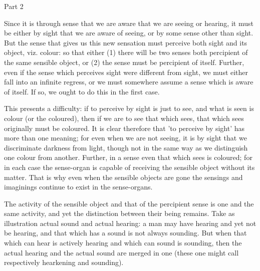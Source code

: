 Part 2

Since it is through sense that we are aware that we are seeing or
hearing, it must be either by sight that we are aware of seeing, or
by some sense other than sight. But the sense that gives us this new
sensation must perceive both sight and its object, viz. colour: so
that either (1) there will be two senses both percipient of the same
sensible object, or (2) the sense must be percipient of itself. Further,
even if the sense which perceives sight were different from sight,
we must either fall into an infinite regress, or we must somewhere
assume a sense which is aware of itself. If so, we ought to do this
in the first case. 

This presents a difficulty: if to perceive by sight is just to see,
and what is seen is colour (or the coloured), then if we are to see
that which sees, that which sees originally must be coloured. It is
clear therefore that 'to perceive by sight' has more than one meaning;
for even when we are not seeing, it is by sight that we discriminate
darkness from light, though not in the same way as we distinguish
one colour from another. Further, in a sense even that which sees
is coloured; for in each case the sense-organ is capable of receiving
the sensible object without its matter. That is why even when the
sensible objects are gone the sensings and imaginings continue to
exist in the sense-organs. 

The activity of the sensible object and that of the percipient sense
is one and the same activity, and yet the distinction between their
being remains. Take as illustration actual sound and actual hearing:
a man may have hearing and yet not be hearing, and that which has
a sound is not always sounding. But when that which can hear is actively
hearing and which can sound is sounding, then the actual hearing and
the actual sound are merged in one (these one might call respectively
hearkening and sounding). 

